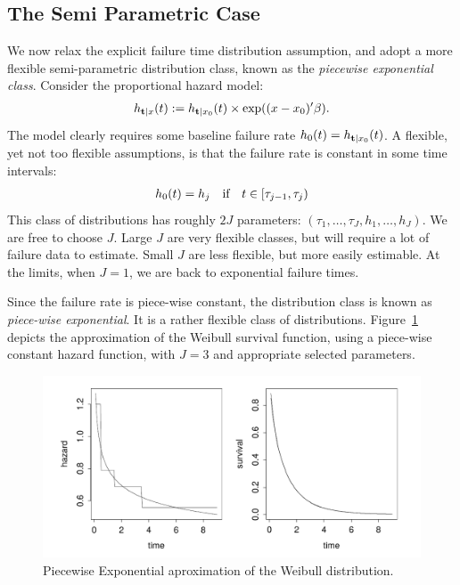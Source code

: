 \subsection{The Semi Parametric Case}
We now relax the explicit failure time distribution assumption, and adopt a more flexible semi-parametric distribution class, known as the \emph{piecewise exponential class}.
Consider the proportional hazard model:
\begin{align}
	h_{\mathbf{t}|x} (t):=h_{\mathbf{t}|x_0} (t) \times \exp((x-x_0)'\beta).
\end{align}
The model clearly requires some baseline failure rate $h_{0} (t)=h_{\mathbf{t}|x_0} (t)$.
A flexible, yet not too flexible assumptions, is that the failure rate is constant in some time intervals:
\begin{align}
	h_{0} (t)=h_j \quad \text{if} \quad t\in [\tau_{j-1},\tau_j)
\end{align}
This class of distributions has roughly $2J$ parameters: $(\tau_1,\dots,\tau_J,h_1,\dots,h_J)$.
We are free to choose $J$. 
Large $J$ are very flexible classes, but will require a lot of failure data to estimate.
Small $J$ are less flexible, but more easily estimable. 
At the limits, when $J=1$, we are back to exponential failure times. 

Since the failure rate is piece-wise constant, the distribution class is known as \emph{piece-wise exponential}.
It is a rather flexible class of distributions. Figure~\ref{fig:piecewise_exponential} depicts the approximation of the Weibull survival function, using a piece-wise constant hazard function, with $J=3$ and appropriate selected parameters.
\begin{figure}[ht]
\centering
\includegraphics[height=0.2\textheight]{art/piecewise_exponential}
\caption{Piecewise Exponential aproximation of the Weibull distribution.}
\label{fig:piecewise_exponential}
\end{figure}


